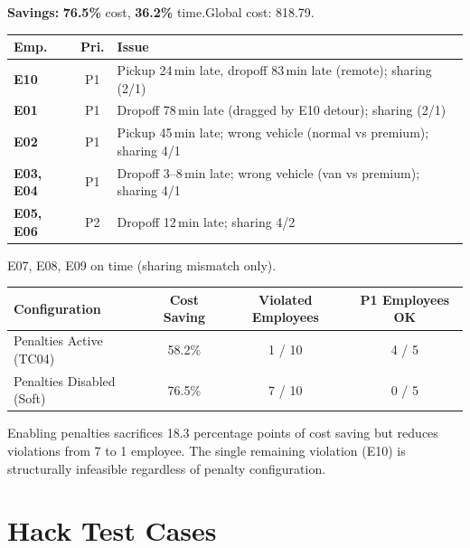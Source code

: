\documentclass[11pt,a4paper]{article}
\newcommand{\saving}[1]{\textcolor{velgreen}{\textbf{#1}}}
\begin{document}
\vspace{4pt}
\textbf{Savings:} \saving{76.5\%} cost, \saving{36.2\%} time.\quad Global cost: 818.79.

\begin{warnbox}
\small
\begin{tabular}{>{\bfseries}l c p{8.2cm}}
\toprule
\textbf{Emp.} & \textbf{Pri.} & \textbf{Issue} \\
\midrule
\rowcolor{red!4}
E10 & P1 & Pickup 24\,min late, dropoff 83\,min late (remote); sharing (2/1) \\
E01 & P1 & Dropoff 78\,min late (dragged by E10 detour); sharing (2/1) \\
\rowcolor{red!4}
E02 & P1 & Pickup 45\,min late; wrong vehicle (normal vs premium); sharing 4/1 \\
E03, E04 & P1 & Dropoff 3--8\,min late; wrong vehicle (van vs premium); sharing 4/1 \\
\rowcolor{red!4}
E05, E06 & P2 & Dropoff 12\,min late; sharing 4/2 \\
\bottomrule
\end{tabular}

\vspace{3pt}
E07, E08, E09 on time (sharing mismatch only).
\end{warnbox}

\begin{insightbox}
\begin{tabular}{lccc}
\toprule
\textbf{Configuration} & \textbf{Cost Saving} & \textbf{Violated Employees} & \textbf{P1 Employees OK} \\
\midrule
\rowcolor{rowalt}
Penalties Active (TC04) & 58.2\% & 1 / 10 & 4 / 5 \\
Penalties Disabled (Soft) & 76.5\% & 7 / 10 & 0 / 5 \\
\bottomrule
\end{tabular}

\vspace{4pt}
Enabling penalties sacrifices 18.3 percentage points of cost saving but reduces violations from 7 to 1 employee. The single remaining violation (E10) is structurally infeasible regardless of penalty configuration.
\end{insightbox}

\newpage
\section{Hack Test Cases}
\label{sec:hack}
\end{document}
